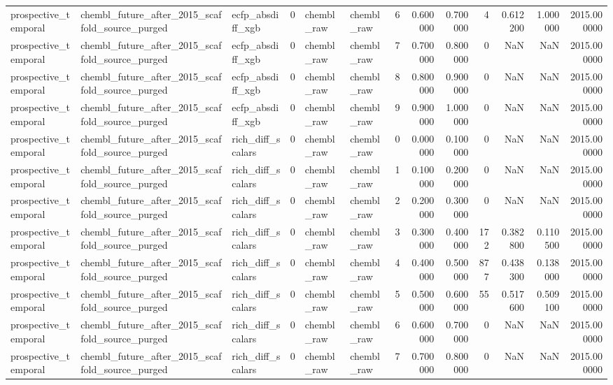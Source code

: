 \begin{longtable}{lllrllrrrrrrr}
prospective\_temporal & chembl\_future\_after\_2015\_scaffold\_source\_purged & ecfp\_absdiff\_xgb & 0 & chembl\_raw & chembl\_raw & 6 & 0.600000 & 0.700000 & 4 & 0.612200 & 1.000000 & 2015.000000 \\
prospective\_temporal & chembl\_future\_after\_2015\_scaffold\_source\_purged & ecfp\_absdiff\_xgb & 0 & chembl\_raw & chembl\_raw & 7 & 0.700000 & 0.800000 & 0 & NaN & NaN & 2015.000000 \\
prospective\_temporal & chembl\_future\_after\_2015\_scaffold\_source\_purged & ecfp\_absdiff\_xgb & 0 & chembl\_raw & chembl\_raw & 8 & 0.800000 & 0.900000 & 0 & NaN & NaN & 2015.000000 \\
prospective\_temporal & chembl\_future\_after\_2015\_scaffold\_source\_purged & ecfp\_absdiff\_xgb & 0 & chembl\_raw & chembl\_raw & 9 & 0.900000 & 1.000000 & 0 & NaN & NaN & 2015.000000 \\
prospective\_temporal & chembl\_future\_after\_2015\_scaffold\_source\_purged & rich\_diff\_scalars & 0 & chembl\_raw & chembl\_raw & 0 & 0.000000 & 0.100000 & 0 & NaN & NaN & 2015.000000 \\
prospective\_temporal & chembl\_future\_after\_2015\_scaffold\_source\_purged & rich\_diff\_scalars & 0 & chembl\_raw & chembl\_raw & 1 & 0.100000 & 0.200000 & 0 & NaN & NaN & 2015.000000 \\
prospective\_temporal & chembl\_future\_after\_2015\_scaffold\_source\_purged & rich\_diff\_scalars & 0 & chembl\_raw & chembl\_raw & 2 & 0.200000 & 0.300000 & 0 & NaN & NaN & 2015.000000 \\
prospective\_temporal & chembl\_future\_after\_2015\_scaffold\_source\_purged & rich\_diff\_scalars & 0 & chembl\_raw & chembl\_raw & 3 & 0.300000 & 0.400000 & 172 & 0.382800 & 0.110500 & 2015.000000 \\
prospective\_temporal & chembl\_future\_after\_2015\_scaffold\_source\_purged & rich\_diff\_scalars & 0 & chembl\_raw & chembl\_raw & 4 & 0.400000 & 0.500000 & 877 & 0.438300 & 0.138000 & 2015.000000 \\
prospective\_temporal & chembl\_future\_after\_2015\_scaffold\_source\_purged & rich\_diff\_scalars & 0 & chembl\_raw & chembl\_raw & 5 & 0.500000 & 0.600000 & 55 & 0.517600 & 0.509100 & 2015.000000 \\
prospective\_temporal & chembl\_future\_after\_2015\_scaffold\_source\_purged & rich\_diff\_scalars & 0 & chembl\_raw & chembl\_raw & 6 & 0.600000 & 0.700000 & 0 & NaN & NaN & 2015.000000 \\
prospective\_temporal & chembl\_future\_after\_2015\_scaffold\_source\_purged & rich\_diff\_scalars & 0 & chembl\_raw & chembl\_raw & 7 & 0.700000 & 0.800000 & 0 & NaN & NaN & 2015.000000 \\

\end{longtable}
